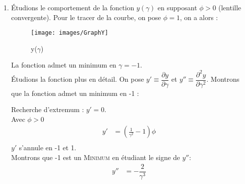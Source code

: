 \documentclass[12pt,a4paper]{article}
\begin{document}
\begin{enumerate}
		\vspace*{+1em}
		De plus on sait que : $\dfrac {\overline {AB}} {p}=\dfrac {\overline {A'B'}} {p'}\implies\dfrac{p'}{p}=\gamma$, ainsi :
		\begin{empheq}[left=\empheqlbrace]{align}
		y&=-\\
		p' &= -\phi()\\
		&=\gamma
		\end{empheq}
		En combinant (2) et (3), on obtient : $p=\dfrac{-\phi(\gamma - 1)}{\gamma}$. On injecte dans (1) :
		\begingroup
		\addtolength{\jot}{1em}
		\begin{align*}
		y&=-\dfrac{p^2}{p+\phi}\\
		&=\dfrac{\left( \phi\dfrac{\gamma-1}{\gamma}\right)^2}{\left(\phi\dfrac{\gamma-1}{\gamma}\right) -\dfrac{\phi \gamma}{\gamma}}\\
		&=\dfrac{\phi^2(\gamma-1)^2}{\gamma^2\dfrac{\phi}{\gamma}(\gamma-1-\gamma)}\\
		&=\dfrac{-\phi(\gamma-1)^2}{\gamma}
		\end{align*}
		\endgroup
		On a alors : $y=\dfrac{-\phi(\gamma-1)^2}{\gamma}$\\
		\item 
		Étudions le comportement de la fonction $y(\gamma)$ en supposant $\phi>0$ (lentille convergente). Pour le tracer de la courbe, on pose $\phi=1$, on a alors :
		\begin{figure}[h]
			\centering
			\caption[]{y($\gamma$)}
			\label{fig:graphy}
			\texttt{[image: images/GraphY]}
		\end{figure}
		La fonction admet un minimum en $\gamma=-1$.\\
		Étudions la fonction plus en détail. On pose $y'\equiv\dfrac {\partial y} {\partial \gamma }$ et $y''\equiv\dfrac {\partial^2 y} {\partial \gamma^2 }$. Montrons que la fonction admet un minimum en -1 :
		\begin{multicols}{2}
			Recherche d'extremum : $y'=0$.\\
			Avec $\phi>0$
			\begin{align*}
			y'&=\left(\frac{1}{\gamma ^2}-1\right) \phi\\
			\end{align*}
			$y'$ s'annule en -1 et 1.
			\setlength\columnseprule{0.4pt}
			\columnbreak
			\\
			Montrons que -1 est un \textsc{Minimum} en étudiant le signe de $y''$:
			\begin{align*}
			y''&=-\dfrac{2}{\gamma^3}\\

\end{align*}
\end{multicols}
\end{enumerate}
\end{document}
